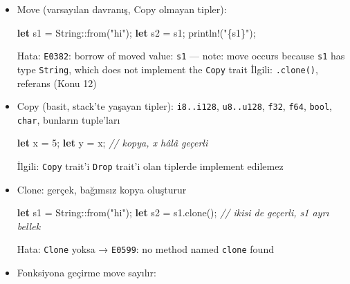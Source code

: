 \documentclass[12pt,a4paper]{article}
\newenvironment{Shaded}{}{}
\newcommand{\CommentTok}[1]{\textcolor[rgb]{0.38,0.63,0.69}{\textit{#1}}}
\newcommand{\DataTypeTok}[1]{\textcolor[rgb]{0.56,0.13,0.00}{#1}}
\newcommand{\DecValTok}[1]{\textcolor[rgb]{0.25,0.63,0.44}{#1}}
\newcommand{\FunctionTok}[1]{\textcolor[rgb]{0.02,0.16,0.49}{#1}}
\newcommand{\KeywordTok}[1]{\textcolor[rgb]{0.00,0.44,0.13}{\textbf{#1}}}
\newcommand{\NormalTok}[1]{#1}
\newcommand{\OperatorTok}[1]{\textcolor[rgb]{0.40,0.40,0.40}{#1}}
\newcommand{\StringTok}[1]{\textcolor[rgb]{0.25,0.44,0.63}{#1}}
\begin{document}
\begin{itemize}
\item
  Move (varsayılan davranış, Copy olmayan tipler):

\begin{Shaded}
\begin{Highlighting}[]
\KeywordTok{let}\NormalTok{ s1 }\OperatorTok{=} \DataTypeTok{String}\OperatorTok{::}\FunctionTok{from}\OperatorTok{(}\StringTok{"hi"}\OperatorTok{);}
\KeywordTok{let}\NormalTok{ s2 }\OperatorTok{=}\NormalTok{ s1}\OperatorTok{;}
\NormalTok{println}\OperatorTok{!(}\StringTok{"\{s1\}"}\OperatorTok{);}
\end{Highlighting}
\end{Shaded}


  Hata: \texttt{E0382}: borrow of moved value: \texttt{s1} --- note: move occurs because \texttt{s1} has type \texttt{String}, which does not implement the \texttt{Copy} trait
  İlgili: \texttt{.clone()}, referans (Konu 12)
\item
  Copy (basit, stack'te yaşayan tipler): \texttt{i8..i128}, \texttt{u8..u128}, \texttt{f32}, \texttt{f64}, \texttt{bool}, \texttt{char}, bunların tuple'ları

\begin{Shaded}
\begin{Highlighting}[]
\KeywordTok{let}\NormalTok{ x }\OperatorTok{=} \DecValTok{5}\OperatorTok{;}
\KeywordTok{let}\NormalTok{ y }\OperatorTok{=}\NormalTok{ x}\OperatorTok{;}          \CommentTok{// kopya, x hâlâ geçerli}
\end{Highlighting}
\end{Shaded}


  İlgili: \texttt{Copy} trait'i \texttt{Drop} trait'i olan tiplerde implement edilemez
\item
  Clone: gerçek, bağımsız kopya oluşturur

\begin{Shaded}
\begin{Highlighting}[]
\KeywordTok{let}\NormalTok{ s1 }\OperatorTok{=} \DataTypeTok{String}\OperatorTok{::}\FunctionTok{from}\OperatorTok{(}\StringTok{"hi"}\OperatorTok{);}
\KeywordTok{let}\NormalTok{ s2 }\OperatorTok{=}\NormalTok{ s1}\OperatorTok{.}\FunctionTok{clone}\OperatorTok{();}   \CommentTok{// ikisi de geçerli, s1 ayrı bellek}
\end{Highlighting}
\end{Shaded}


  Hata: \texttt{Clone} yoksa → \texttt{E0599}: no method named \texttt{clone} found
\item
  Fonksiyona geçirme move sayılır:


\end{itemize}
\end{document}
